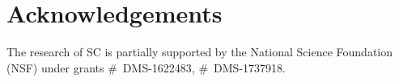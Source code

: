 \documentclass[ejs]{imsart}
\theoremstyle{definition} \newtheorem{Definition}[Theorem]{Definition}
\begin{document}








\section*{Acknowledgements}
The research of SC is partially  supported by the National Science Foundation (NSF) under grants \#~DMS-1622483, \#~DMS-1737918.





\end{document}
